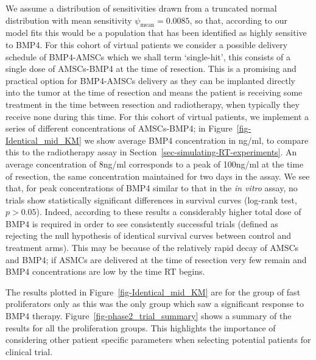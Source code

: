 \documentclass[
  default,
]{sn-jnl}
\begin{document}
We assume a distribution of sensitivities drawn from a truncated normal
distribution with mean sensitivity \(\psi_\text{mean} = 0.0085\), so
that, according to our model fits this would be a population that has
been identified as highly sensitive to BMP4. For this cohort of virtual
patients we consider a possible delivery schedule of BMP4-AMSCs which we
shall term `single-hit', this consists of a single dose of AMSCs-BMP4 at
the time of resection. This is a promising and practical option for
BMP4-AMSCs delivery as they can be implanted directly into the tumor at
the time of resection and means the patient is receiving some treatment
in the time between resection and radiotherapy, when typically they
receive none during this time. For this cohort of virtual patients, we
implement a series of different concentrations of AMSCs-BMP4; in
Figure~\ref{fig-Identical_mid_KM} we show average BMP4 concentration in
ng/ml, to compare this to the radiotherapy assay in
Section~\ref{sec-simulating-RT-experiments}. An average concentration of
8ng/ml corresponds to a peak of 100ng/ml at the time of resection, the
same concentration maintained for two days in the assay. We see that,
for peak concentrations of BMP4 similar to that in the \emph{in vitro}
assay, no trials show statistically significant differences in survival
curves (log-rank test, \(p>0.05\)). Indeed, according to these results a
considerably higher total dose of BMP4 is required in order to see
consistently successful trials (defined as rejecting the null hypothesis
of identical survival curves between control and treatment arms). This
may be because of the relatively rapid decay of AMSCs and BMP4; if ASMCs
are delivered at the time of resection very few remain and BMP4
concentrations are low by the time RT begins.

The results plotted in Figure~\ref{fig-Identical_mid_KM} are for the
group of fast proliferators only as this was the only group which saw a
significant response to BMP4 therapy.
Figure~\ref{fig-phase2_trial_summary} shows a summary of the results for
all the proliferation groups. This highlights the importance of
considering other patient specific parameters when selecting potential
patients for clinical trial.
\end{document}
